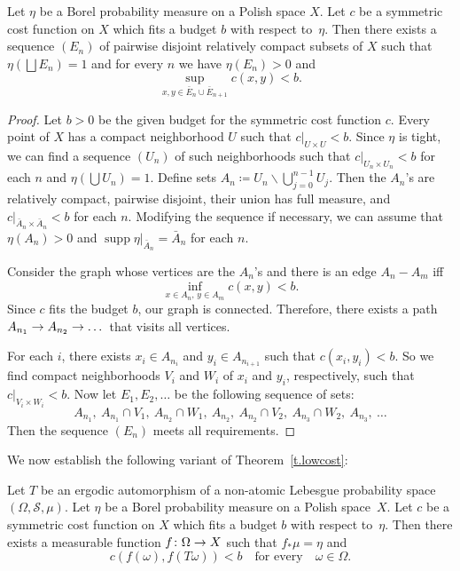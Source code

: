 \documentclass[AHL,Unicode,longabstracts,published]{cedram}
\DeclareMathOperator{\supp}{supp}
\newcommand{\clS}{\mathcal{S}}
\renewcommand{\setminus}{\smallsetminus}
\renewcommand*{\to}{\mathchoice{\longrightarrow}{\rightarrow}{\rightarrow}{\rightarrow}}
\begin{document}
\begin{lemm}\label{l.March}
Let $\eta$ be a Borel probability measure on a Polish space $X$. Let $c$ be a symmetric cost function on $X$ which fits a budget $b$ with respect to~$\eta$. Then there exists a sequence $(E_n)$ of pairwise disjoint relatively compact subsets of $X$ such that $\eta(\bigsqcup E_n) = 1$ and for every $n$ we have $\eta(E_n)>0$ and
\begin{equation}
\sup_{x,y \in \bar{E}_n \cup \bar{E}_{n+1}} c(x,y) < b.
\end{equation}
\end{lemm}

\begin{proof}
Let $b>0$ be the given budget for the symmetric cost function $c$. Every point of $X$ has a compact neighborhood $U$ such that $c|_{U \times U} < b$. Since $\eta$ is tight, we can find a sequence $(U_n)$ of such neighborhoods such that $c|_{U_n \times U_n} < b$ for each $n$ and $\eta(\bigcup U_n) = 1$. Define sets $A_n \coloneqq U_n \setminus \bigcup_{j=0}^{n-1} U_j$. Then the $A_n$'s are relatively compact, pairwise disjoint, their union has full measure, and $c|_{\bar{A}_n \times \bar{A}_n} < b$ for each $n$. Modifying the sequence if necessary, we can assume that $\eta(A_n)>0$ and $\supp \eta|_{\bar{A}_n} = \bar{A}_n$ for each $n$.


Consider the graph whose vertices are the $A_n$'s and there is an edge $A_n - A_m$ iff
\begin{equation}
\inf_{x \in A_n, \, y \in A_m} c(x,y) < b.
\end{equation}
Since $c$ fits the budget $b$, our graph is connected. Therefore, there exists a path $A_{n_1} \to A_{n_2} \to \dots$ that visits all vertices.

For each $i$, there exists $x_i \in A_{n_i}$ and $y_i \in A_{n_{i+1}}$ such that $c(x_i,y_i) < b$. So we find compact neighborhoods $V_i$ and $W_i$ of $x_i$ and $y_i$, respectively, such that $c|_{V_i \times W_i} < b$. Now let $E_1,E_2,\dots$ be the following sequence of sets:
\begin{equation}
A_{n_1}, \ A_{n_1} \cap V_1, \ A_{n_2} \cap W_1, \ A_{n_2}, \ A_{n_2} \cap V_2, \ A_{n_3} \cap W_2, \ A_{n_3}, \ \dots
\end{equation}
Then the sequence $(E_n)$ meets all requirements.
\end{proof}

We now establish the following variant of Theorem~\ref{t.lowcost}:

\begin{theo}\label{t.boundedcost}
Let $T$ be an ergodic automorphism of a non-atomic Lebesgue probability space $(\Omega,\clS,\mu)$. Let $\eta$ be a Borel probability measure on a Polish space~$X$. Let $c$ be a symmetric cost function on $X$ which fits a budget $b$ with respect to~$\eta$. Then there exists a measurable function $f \colon \Omega \to X$ such that $f_* \mu = \eta$ and
\begin{equation}
c(f(\omega),f(T \omega)) < b \quad\text{for every}\quad \omega \in \Omega.
\end{equation}
\end{theo}
\end{document}
